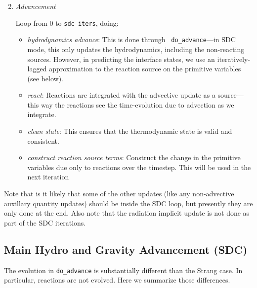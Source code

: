 \begin{enumerate}
\setcounter{enumi}{1}

\item {\em Advancement}

  Loop from 0 to {\tt sdc\_iters}, doing:

  \begin{itemize}
    \item {\em hydrodynamics advance}: This is done through {\tt
      do\_advance}---in SDC mode, this only updates the hydrodynamics,
      including the non-reacting sources.  However, in predicting the
      interface states, we use an iteratively-lagged approximation to the 
      reaction source on the primitive variables (see below).

    \item {\em react}: Reactions are integrated with the advective update
      as a source---this way the reactions see the time-evolution due to
      advection as we integrate.

    \item {\em clean state}: This ensures that the thermodynamic state is
      valid and consistent.

    \item {\em construct reaction source terms}: Construct the change in
      the primitive variables due only to reactions over the timestep.  This
      will be used in the next iteration
  \end{itemize}


\end{enumerate}


Note that is it likely that some of the other updates (like any
non-advective auxillary quantity updates) should be inside the SDC
loop, but presently they are only done at the end.  Also note that the
radiation implicit update is not done as part of the SDC iterations.


\subsection{Main Hydro and Gravity Advancement (SDC)}

The evolution in {\tt do\_advance} is substantially different than the
Strang case.  In particular, reactions are not evolved.  Here we
summarize those differences.

